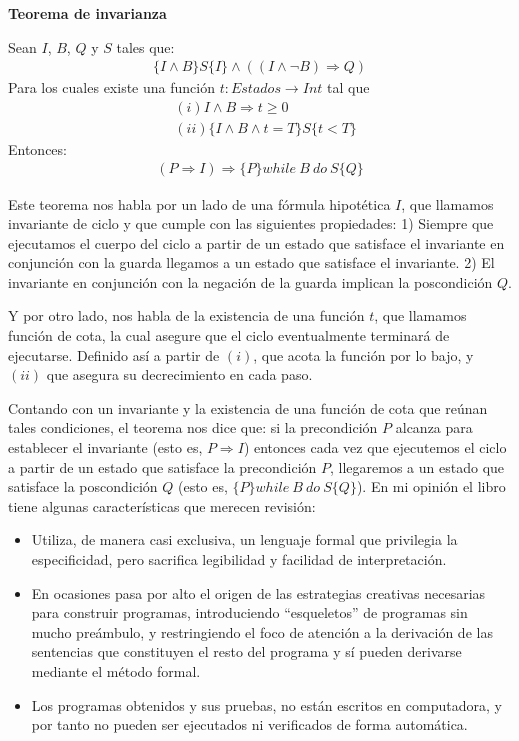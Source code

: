 \documentclass[12pt, a4paper, openany, fleqn]{book}
\begin{document}
    \vspace{1em}

    \noindent\textbf{Teorema de invarianza}

    \noindent Sean $I$, $B$, $Q$ y $S$ tales que:
    \begin{align*}
        \{I \land B\} S \{I\} \land ((I \land \lnot B) \Rightarrow Q)
    \end{align*}
    Para los cuales existe una función $t: Estados \to Int$ tal que
    \begin{align*}
        & (i) I \land B \Rightarrow t \geqslant 0 \\
        & (ii) \{I \land B \land t=T\} S \{t < T\}
    \end{align*}
    Entonces:
    \begin{align*}
        (P \Rightarrow I) \Rightarrow \{P\}while\ B\ do\ S\{Q\}
    \end{align*}

    Este teorema nos habla por un lado de una fórmula hipotética $I$, que llamamos invariante de ciclo y que cumple con las siguientes propiedades: 1) Siempre que ejecutamos el cuerpo del ciclo a partir de un estado que satisface el invariante en conjunción con la guarda llegamos a un estado que satisface el invariante. 2) El invariante en conjunción con la negación de la guarda implican la poscondición $Q$.

    Y por otro lado, nos habla de la existencia de una función $t$, que llamamos función de cota, la cual asegure que el ciclo eventualmente terminará de ejecutarse. Definido así a partir de $(i)$, que acota la función por lo bajo, y $(ii)$ que asegura su decrecimiento en cada paso.

    Contando con un invariante y la existencia de una función de cota que reúnan tales condiciones, el teorema nos dice que: si la precondición $P$ alcanza para establecer el invariante (esto es, $P \Rightarrow I$) entonces cada vez que ejecutemos el ciclo a partir de un estado que satisface la precondición $P$, llegaremos a un estado que satisface la poscondición $Q$ (esto es, $\{P\}while\ B\ do\ S\{Q\}$).
    En mi opinión el libro tiene algunas características que merecen revisión:
    \begin{itemize}
    \item Utiliza, de manera casi exclusiva, un lenguaje formal que privilegia la especificidad, pero sacrifica legibilidad y facilidad de interpretación.
    \item En ocasiones pasa por alto el origen de las estrategias creativas necesarias para construir programas, introduciendo ``esqueletos'' de programas sin mucho preámbulo, y restringiendo el foco de atención a la derivación de las sentencias que constituyen el resto del programa y sí pueden derivarse mediante el método formal.
    \item Los programas obtenidos y sus pruebas, no están escritos en computadora, y por tanto no pueden ser ejecutados ni verificados de forma automática.
    \end{itemize}
\end{document}
